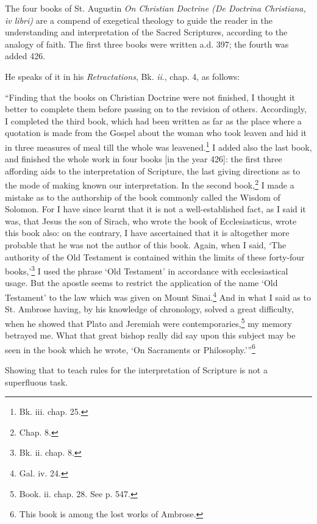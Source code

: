 
The four books of St. Augustin \emph{On Christian Doctrine (De Doctrina Christiana, iv libri)} are a compend of exegetical theology to guide the reader in the understanding and interpretation of the Sacred Scriptures, according to the analogy of faith. The first three books were written a.d. 397; the fourth was added 426.

He speaks of it in his \emph{ Retractations}, Bk. \emph{ii}., chap. 4, as follows:

“Finding that the books on Christian Doctrine were not finished, I thought it better to complete them before passing on to the revision of others. Accordingly, I completed the third book, which had been written as far as the place where a quotation is made from the Gospel about the woman who took leaven and hid it in three measures of meal till the whole was leavened.\footnote{Bk. iii. chap. 25.} I added also the last book, and finished the whole work in four books [in the year 426]: the first three affording aids to the interpretation of Scripture, the last giving directions as to the mode of making known our interpretation. In the second book,\footnote{Chap. 8.} I made a mistake as to the authorship of the book commonly called the Wisdom of Solomon. For I have since learnt that it is not a well-established fact, as I said it was, that Jesus the son of Sirach, who wrote the book of Ecclesiasticus, wrote this book also: on the contrary, I have ascertained that it is altogether more probable that he was not the author of this book. Again, when I said, ‘The authority of the Old Testament is contained within the limits of these forty-four books,’\footnote{Bk. ii. chap. 8.} I used the phrase ‘Old Testament’ in accordance with ecclesiastical usage. But the apostle seems to restrict the application of the name ‘Old Testament’ to the law which was given on Mount Sinai.\footnote{Gal. iv. 24.} And in what I said as to St. Ambrose having, by his knowledge of chronology, solved a great difficulty, when he showed that Plato and Jeremiah were contemporaries,\footnote{Book. ii. chap. 28. See p. 547.} my memory betrayed me. What that great bishop really did say upon this subject may be seen in the book which he wrote, ‘On Sacraments or Philosophy.’”\footnote{This book is among the lost works of Ambrose.}


Showing that to teach rules for the interpretation of Scripture is not a superfluous task.

